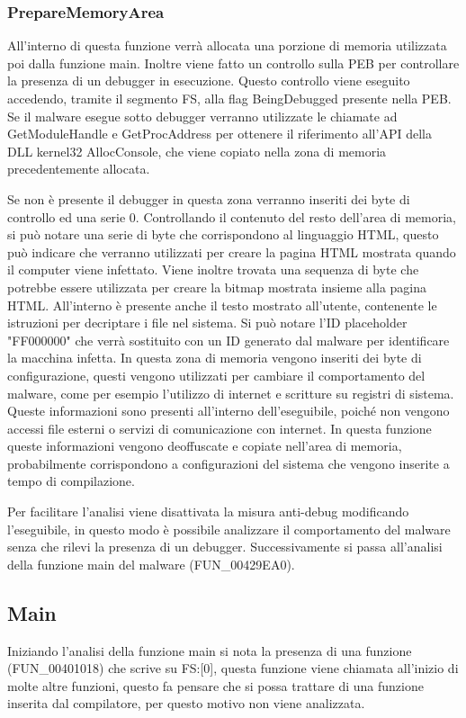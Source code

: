 \documentclass[a4paper,12pt]{article}
\begin{document}
\subsubsection{PrepareMemoryArea}
All'interno di questa funzione verrà allocata una porzione di memoria utilizzata poi dalla funzione main. Inoltre viene fatto un controllo sulla PEB per controllare la presenza di un debugger in esecuzione. Questo controllo viene eseguito accedendo, tramite il segmento FS, alla flag BeingDebugged presente nella PEB. Se il malware esegue sotto debugger verranno utilizzate le chiamate ad GetModuleHandle e GetProcAddress per ottenere il riferimento all'API della DLL kernel32 AllocConsole, che viene copiato nella zona di memoria precedentemente allocata. 

Se non è presente il debugger in questa zona verranno inseriti dei byte di controllo ed una serie 0. Controllando il contenuto del resto dell'area di memoria, si può notare una serie di byte che corrispondono al linguaggio HTML, questo può indicare che verranno utilizzati per creare la pagina HTML mostrata quando il computer viene infettato. Viene inoltre trovata una sequenza di byte che potrebbe essere utilizzata per creare la bitmap mostrata insieme alla pagina HTML. All'interno è presente anche il testo mostrato all'utente, contenente le istruzioni per decriptare i file nel sistema. Si può notare l'ID placeholder "FF000000" che verrà sostituito con un ID generato dal malware per identificare la macchina infetta. 
In questa zona di memoria vengono inseriti dei byte di configurazione, questi vengono utilizzati per cambiare il comportamento del malware, come per esempio l'utilizzo di internet e scritture su registri di sistema.  Queste informazioni sono presenti all'interno dell'eseguibile, poiché non vengono accessi file esterni o servizi di comunicazione con internet. In questa funzione queste informazioni vengono deoffuscate e copiate nell'area di memoria, probabilmente corrispondono a configurazioni del sistema che vengono inserite a tempo di compilazione. 

Per facilitare l'analisi viene disattivata la misura anti-debug modificando l'eseguibile, in questo modo è possibile analizzare il comportamento del malware senza che rilevi la presenza di un debugger. 
Successivamente si passa all'analisi della funzione main del malware (FUN\_00429EA0).

\subsection{Main}
Iniziando l'analisi della funzione main si nota la presenza di una funzione (FUN\_00401018) che scrive su FS:[0], questa funzione viene chiamata all'inizio di molte altre funzioni, questo fa pensare che si possa trattare di una funzione inserita dal compilatore, per questo motivo non viene analizzata.
\end{document}
